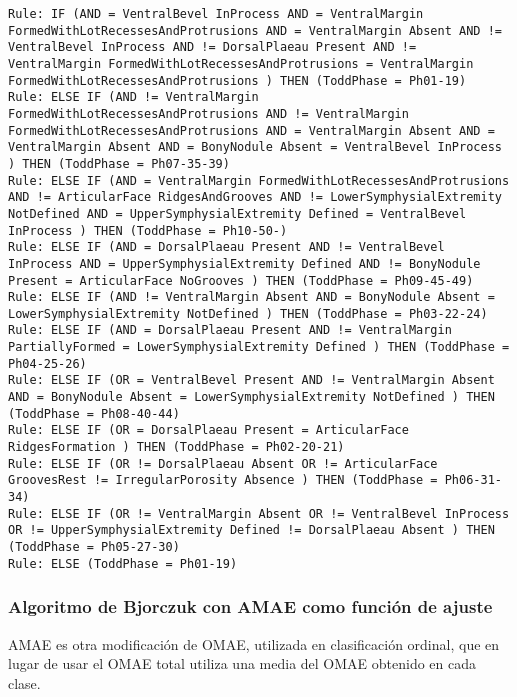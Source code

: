 \begin{lstlisting}
Rule: IF (AND = VentralBevel InProcess AND = VentralMargin FormedWithLotRecessesAndProtrusions AND = VentralMargin Absent AND != VentralBevel InProcess AND != DorsalPlaeau Present AND != VentralMargin FormedWithLotRecessesAndProtrusions = VentralMargin FormedWithLotRecessesAndProtrusions ) THEN (ToddPhase = Ph01-19)
Rule: ELSE IF (AND != VentralMargin FormedWithLotRecessesAndProtrusions AND != VentralMargin FormedWithLotRecessesAndProtrusions AND = VentralMargin Absent AND = VentralMargin Absent AND = BonyNodule Absent = VentralBevel InProcess ) THEN (ToddPhase = Ph07-35-39)
Rule: ELSE IF (AND = VentralMargin FormedWithLotRecessesAndProtrusions AND != ArticularFace RidgesAndGrooves AND != LowerSymphysialExtremity NotDefined AND = UpperSymphysialExtremity Defined = VentralBevel InProcess ) THEN (ToddPhase = Ph10-50-)
Rule: ELSE IF (AND = DorsalPlaeau Present AND != VentralBevel InProcess AND = UpperSymphysialExtremity Defined AND != BonyNodule Present = ArticularFace NoGrooves ) THEN (ToddPhase = Ph09-45-49)
Rule: ELSE IF (AND != VentralMargin Absent AND = BonyNodule Absent = LowerSymphysialExtremity NotDefined ) THEN (ToddPhase = Ph03-22-24)
Rule: ELSE IF (AND = DorsalPlaeau Present AND != VentralMargin PartiallyFormed = LowerSymphysialExtremity Defined ) THEN (ToddPhase = Ph04-25-26)
Rule: ELSE IF (OR = VentralBevel Present AND != VentralMargin Absent AND = BonyNodule Absent = LowerSymphysialExtremity NotDefined ) THEN (ToddPhase = Ph08-40-44)
Rule: ELSE IF (OR = DorsalPlaeau Present = ArticularFace RidgesFormation ) THEN (ToddPhase = Ph02-20-21)
Rule: ELSE IF (OR != DorsalPlaeau Absent OR != ArticularFace GroovesRest != IrregularPorosity Absence ) THEN (ToddPhase = Ph06-31-34)
Rule: ELSE IF (OR != VentralMargin Absent OR != VentralBevel InProcess OR != UpperSymphysialExtremity Defined != DorsalPlaeau Absent ) THEN (ToddPhase = Ph05-27-30)
Rule: ELSE (ToddPhase = Ph01-19)
\end{lstlisting}

\newpage

\subsubsection{Algoritmo de Bjorczuk con AMAE como función de ajuste}


AMAE \cite{funcionesClasificacionOrdinal} es otra modificación de OMAE, utilizada en clasificación ordinal, que en lugar de usar el OMAE total utiliza una media del OMAE obtenido en cada clase.


